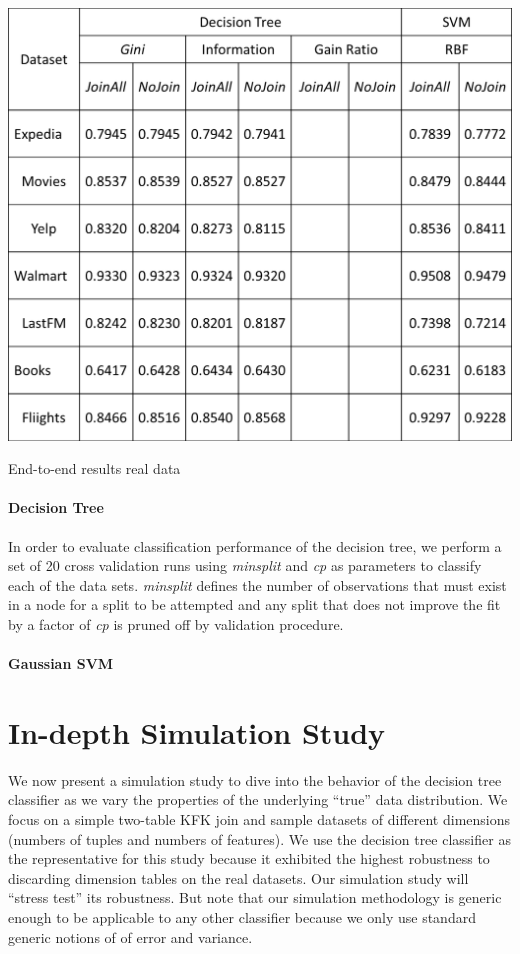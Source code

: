\documentclass[sigconf]{acmart}
\begin{document}
\begin{table}
\centering
\includegraphics[width=\columnwidth,height=\textheight,keepaspectratio]{table2.png}
\caption{End-to-end results real data}
\label{Table:svm_tree}
\end{table}
\paragraph*{Decision Tree}
In order to evaluate classification performance of the decision tree, we perform a set of 20 cross validation runs using \textit{minsplit} and \textit{cp} as parameters to classify each of the data sets. \textit{minsplit} defines the number of observations that must exist in a node for a split to be attempted and any split that does not improve the fit by a factor of \textit{cp} is pruned off by validation procedure.   
\paragraph*{Gaussian SVM}


\section{In-depth Simulation Study}

We now present a simulation study to dive into the behavior of the decision tree classifier as we vary the 
properties of the underlying ``true'' data distribution. We focus on a simple two-table KFK join and sample datasets of 
different dimensions (numbers of tuples and numbers of features).
We use the decision tree classifier as the representative for this study because it exhibited the highest robustness to 
discarding dimension tables on the real datasets. Our simulation study will ``stress test'' its robustness.
But note that our simulation methodology is generic enough to be applicable to any other classifier because we only use 
standard generic notions of of error and variance.
\end{document}
